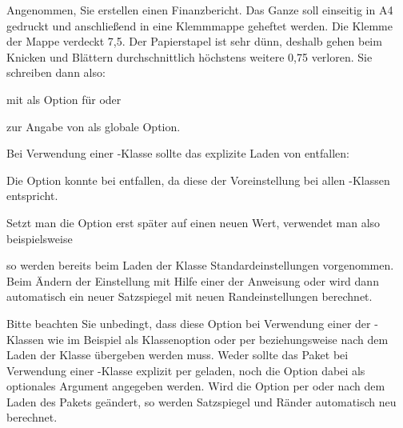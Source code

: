 \begin{Example}
  Angenommen, Sie erstellen einen Finanzbericht. Das Ganze soll
  einseitig in A4 gedruckt und anschließend in eine Klemmmappe
  geheftet werden. Die Klemme der Mappe verdeckt 7,5.
  Der Papierstapel ist sehr dünn, deshalb gehen beim Knicken und
  Blättern durchschnittlich höchstens weitere 0,75
  verloren. Sie schreiben dann also:
  mit  als Option für  oder
  zur Angabe von  als globale Option.

  Bei Verwendung einer \KOMAScript-Klasse sollte das explizite Laden von
   entfallen:
  Die Option  konnte bei  entfallen, da diese
  der Voreinstellung bei allen \KOMAScript-Klassen entspricht.

  Setzt man die Option erst später auf einen neuen Wert, verwendet man also
  beispielsweise
  so werden bereits beim Laden der Klasse 
  Standardeinstellungen vorgenommen. Beim Ändern der Einstellung mit Hilfe
  einer der Anweisung  oder
   wird dann automatisch ein neuer
  Satzspiegel mit neuen Randeinstellungen berechnet.
\end{Example}

Bitte beachten Sie unbedingt, dass diese Option bei
Verwendung einer der \KOMAScript-Klassen wie im Beispiel als Klassenoption
oder per  beziehungsweise
 nach dem Laden der Klasse übergeben werden
muss. Weder sollte das Paket  bei Verwendung einer
\KOMAScript-Klasse explizit per  geladen,
noch die Option dabei als optionales Argument angegeben
werden. Wird die Option per
 oder 
nach dem Laden des Pakets geändert, so werden Satzspiegel und Ränder
automatisch neu berechnet.%
%
\EndIndexGroup


